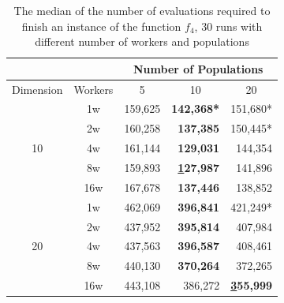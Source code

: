 \documentclass[review]{elsarticle}
\begin{document}
\begin{table}[tbp]
  \caption{The median of the number of evaluations required to finish an instance of the function $f_4$, 30 runs
  with different number of workers and populations}
  \label{tab:evals_instance}
  \vspace{0.25cm}
  \centering

  \begin{tabular}{|c|c|r|r|r|}
  \hline
  \multicolumn{1}{|c}{} &   \multicolumn{1}{c}{}  & \multicolumn{3}{|c|}{Number of Populations} \\
  \hline
  Dimension           & Workers & \multicolumn{1}{c|}{5}       & \multicolumn{1}{c|}{10}      & \multicolumn{1}{c|}{20}          \\
  \hline
  \multirow{5}{*}{10} & 1w      & 159,625      & \textbf{142,368*}      & 151,680*     \\
                      & 2w      & 160,258      & \textbf{137,385}      & 150,445*     \\
                      & 4w      & 161,144      & \textbf{129,031}      & 144,354     \\
                      & 8w      & 159,893      & \textbf{{\ul 127,987}}      & 141,896     \\
                      & 16w     & 167,678      & \textbf{137,446}      & 138,852     \\
                      \hline
  \multirow{5}{*}{20} & 1w      & 462,069      & \textbf{396,841}      & 421,249*     \\
                      & 2w      & 437,952      & \textbf{395,814}      & 407,984     \\
                      & 4w      & 437,563      & \textbf{396,587}      & 408,461     \\
                      & 8w      & 440,130      & \textbf{370,264}      & 372,265     \\
                      & 16w     & 443,108      &         386,272       & \textbf{{\ul 355,999}}\\
                      \hline  
  \end{tabular}
  \end{table}
\end{document}
